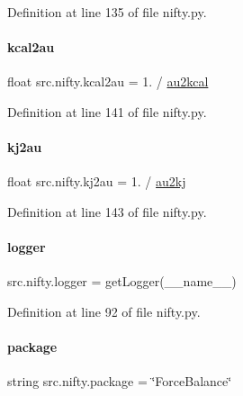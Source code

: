 Definition at line 135 of file nifty.\+py.

\mbox{\label{namespacesrc_1_1nifty_a39edc5592ca319974e55d5e8891a1e7b}} 
\paragraph{\texorpdfstring{kcal2au}{kcal2au}}
{\footnotesize\ttfamily float src.\+nifty.\+kcal2au = 1. / \hyperlink{namespacesrc_1_1nifty_a37759136a820bf4cc8818b4a45865a8d}{au2kcal}}



Definition at line 141 of file nifty.\+py.

\mbox{\label{namespacesrc_1_1nifty_aec1c7f8eea5eec6ad29796827312d19d}} 
\paragraph{\texorpdfstring{kj2au}{kj2au}}
{\footnotesize\ttfamily float src.\+nifty.\+kj2au = 1. / \hyperlink{namespacesrc_1_1nifty_af5788f33a1e5a2d91f1dba0b7dc00f3e}{au2kj}}



Definition at line 143 of file nifty.\+py.

\mbox{\label{namespacesrc_1_1nifty_a4e0494740e9bf31fcd1643da616936c9}} 
\paragraph{\texorpdfstring{logger}{logger}}
{\footnotesize\ttfamily src.\+nifty.\+logger = get\+Logger(\+\_\+\+\_\+name\+\_\+\+\_\+)}



Definition at line 92 of file nifty.\+py.

\mbox{\label{namespacesrc_1_1nifty_a4c9c65626bf4784905a24e3669495270}} 
\paragraph{\texorpdfstring{package}{package}}
{\footnotesize\ttfamily string src.\+nifty.\+package = \char`\"{}Force\+Balance\char`\"{}}



